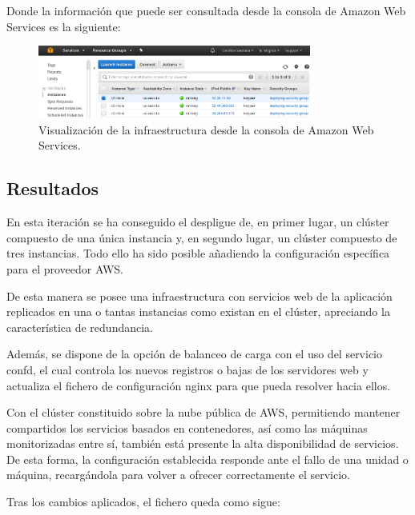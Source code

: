 Donde la información que puede ser consultada desde la consola de Amazon Web Services es la siguiente:

\begin{figure}[H]
\centering
\includegraphics[width=0.8\textwidth]{images/figures/aws-confd.png}
\caption{Visualización de la infraestructura desde la consola de Amazon Web Services.}
\end{figure}

\subsection{Resultados}

En esta iteración se ha conseguido el despligue de, en primer lugar, un clúster compuesto de una única instancia y, en segundo lugar, un clúster compuesto de tres instancias. Todo ello ha sido posible añadiendo la configuración específica para el proveedor AWS.

De esta manera se posee una infraestructura con servicios web de la aplicación replicados en una o tantas instancias como existan en el clúster, apreciando la característica de redundancia. 

Además, se dispone de la opción de balanceo de carga con el uso del servicio confd, el cual controla los nuevos registros o bajas de los servidores web y actualiza el fichero de configuración nginx para que pueda resolver hacia ellos. 

Con el clúster constituido sobre la nube pública de AWS, permitiendo mantener compartidos los servicios basados en contenedores, así como las máquinas monitorizadas entre sí, también está presente la alta disponibilidad de servicios. De esta forma, la configuración establecida responde ante el fallo de una unidad o máquina, recargándola para volver a ofrecer correctamente el servicio.

Tras los cambios aplicados, el fichero  queda como sigue:

